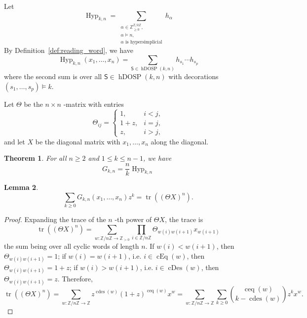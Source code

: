 \documentclass[12pt,reqno]{amsart}
\theoremstyle{plain}
\newtheorem{theorem}{Theorem}[section]
\newtheorem{lemma}[theorem]{Lemma}
\theoremstyle{definition}
\newcommand{\Z}{\mathbb{Z}}
\newcommand{\dosp}{\mathsf{S}}
\DeclareMathOperator{\Hyp}{Hyp}
\DeclareMathOperator{\cEq}{cEq}
\DeclareMathOperator{\cDes}{cDes}
\DeclareMathOperator{\hDOSP}{hDOSP}
\DeclareMathOperator{\tr}{tr}
\DeclareMathOperator{\cdes}{cdes}
\DeclareMathOperator{\ceq}{ceq}
\begin{document}
Let
\begin{equation}\label{eq:Hypkn}
	\Hyp_{k,n}= \sum_{\substack{\alpha \in \Z_{\geq0}^{\Z/k\Z}, \\ \alpha \models n, \\ \alpha \text{ is hypersimplicial}}} h_{\alpha}
\end{equation}
By Definition~\ref{def:reading_word}, we have
\begin{equation}
	\Hyp_{k,n}(x_1,\dots,x_n) = \sum_{\dosp \in \hDOSP(k,n)} h_{s_1}\cdots h_{s_p}
\end{equation}
where the second sum is over all $\dosp \in \hDOSP(k,n)$ with decorations $(s_1,\dots,s_p) \models k$.

Let $ \Theta $ be the $ n \times n $ -matrix with entries
\begin{equation}
	\Theta_{ij}=
	\begin{cases}
		1,   & i<j, \\
		1+z, & i=j, \\
		z,   & i>j,
	\end{cases}
\end{equation}
and let $ X $ be the diagonal matrix with $ x_1,\dots,x_n $ along the diagonal.

\begin{theorem}\label{thm:GHyp}
	For all $n \geq 2$ and $1 \leq k \leq n-1$, we have
	\begin{equation}
		G_{k,n}= \frac{n}{k} \Hyp_{k,n}
	\end{equation}
\end{theorem}

\begin{lemma}\label{lem:Gtrace}
	\begin{equation}
		\sum_{k \geq 0} G_{k,n}(x_1,\dots,x_n) z^k = \tr((\Theta X)^n).
	\end{equation}
\end{lemma}

\begin{proof}
	Expanding the trace of the $ n $ -th power of $ \Theta X $, the trace is
	\begin{equation}
		\tr((\Theta X)^n) = \sum_{w: \Z/n\Z \to \Z_{>0}} \prod_{i \in \Z/n\Z} \Theta_{w(i)w(i+1)} x_{w(i+1)}
	\end{equation}
	the sum being over all cyclic words of length $ n $. If $ w(i) < w(i+1) $, then $
		\Theta_{w(i)w(i+1)} = 1 $; if $ w(i) = w(i+1) $, i.e. $ i \in \cEq(w) $, then $
		\Theta_{w(i)w(i+1)} = 1+z $; if $ w(i) > w(i+1) $, i.e. $ i \in \cDes(w) $, then $
		\Theta_{w(i)w(i+1)} = z $. Therefore,
	\begin{equation}
		\tr((\Theta X)^n) = \sum_{w: \Z/n\Z \to \Z} z^{\cdes(w)} (1+z)^{\ceq(w)} x^w = \sum_{w: \Z/n\Z \to \Z} \sum_{k \geq 0} \binom{\ceq(w)}{k-\cdes(w)} z^k x^w.
	\end{equation}
\end{proof}
\end{document}
